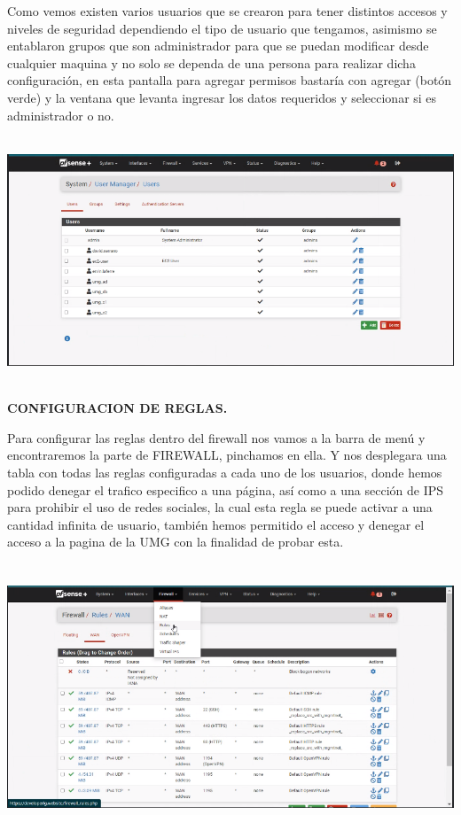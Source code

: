 Como vemos existen varios usuarios que se crearon para tener distintos accesos y niveles de seguridad dependiendo el tipo de usuario que tengamos, asimismo se entablaron grupos que son administrador para que se puedan modificar desde cualquier maquina y no solo se dependa de una persona para realizar dicha configuraci\'{o}n, en esta pantalla para agregar permisos bastar\'{i}a con agregar (bot\'{o}n verde) y la ventana que levanta ingresar los datos requeridos y seleccionar si es administrador o no.



\includegraphics*[width=6.10in, height=2.90in]{image3}



\textbf{CONFIGURACION DE REGLAS.}

Para configurar las reglas dentro del firewall nos vamos a la barra de men\'{u} y encontraremos la parte de FIREWALL, pinchamos en ella. Y nos desplegara una tabla con todas las reglas configuradas a cada uno de los usuarios, donde hemos podido denegar el trafico especifico a una p\'{a}gina, as\'{i} como a una secci\'{o}n de IPS para prohibir el uso de redes sociales, la cual esta regla se puede activar a una cantidad infinita de usuario, tambi\'{e}n hemos permitido el acceso y denegar el acceso a la pagina de la UMG con la finalidad de probar esta.

\includegraphics*[width=6.37in, height=3.14in]{image4}



